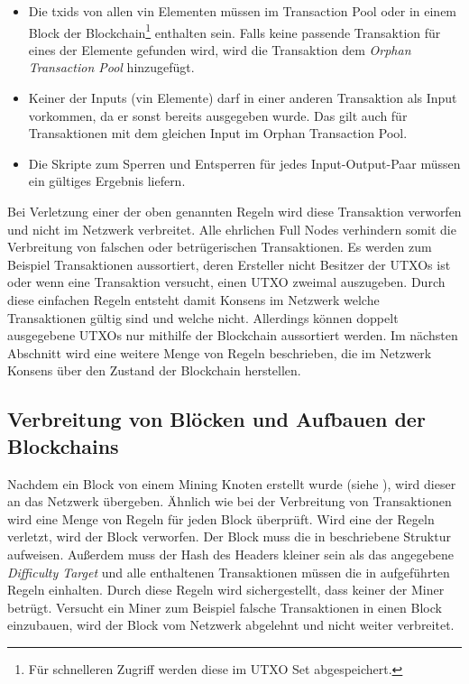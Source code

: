 \documentclass[ngerman,runningheads,a4paper]{llncs}[2018/03/10]
\begin{document}
\begin{itemize}

\item Die txids von allen vin Elementen müssen im Transaction Pool oder in einem Block der Blockchain\footnote{Für schnelleren Zugriff werden diese im UTXO Set abgespeichert.} enthalten sein. Falls keine passende Transaktion für eines der Elemente gefunden wird, wird die Transaktion dem \textit{Orphan Transaction Pool} hinzugefügt.

\item Keiner der Inputs (vin Elemente) darf in einer anderen Transaktion als Input vorkommen, da er sonst bereits ausgegeben wurde. Das gilt auch für Transaktionen mit dem gleichen Input im Orphan Transaction Pool.

\item Die Skripte zum Sperren und Entsperren für jedes Input-Output-Paar müssen ein gültiges Ergebnis liefern.

\end{itemize}

Bei Verletzung einer der oben genannten Regeln wird diese Transaktion verworfen und nicht im Netzwerk verbreitet. Alle ehrlichen Full Nodes verhindern somit die Verbreitung von falschen oder betrügerischen Transaktionen. Es werden zum Beispiel Transaktionen aussortiert, deren Ersteller nicht Besitzer der UTXOs ist oder wenn eine Transaktion versucht, einen UTXO zweimal auszugeben. Durch diese einfachen Regeln entsteht damit Konsens im Netzwerk welche Transaktionen gültig sind und welche nicht. Allerdings können doppelt ausgegebene UTXOs nur mithilfe der Blockchain aussortiert werden. Im nächsten Abschnitt wird eine weitere Menge von Regeln beschrieben, die im Netzwerk Konsens über den Zustand der Blockchain herstellen.

\subsection{Verbreitung von Blöcken und Aufbauen der Blockchains}\label{sec:blockverbreitung}

Nachdem ein Block von einem Mining Knoten erstellt wurde (siehe ), wird dieser an das Netzwerk übergeben. Ähnlich wie bei der Verbreitung von Transaktionen wird eine Menge von Regeln für jeden Block überprüft. Wird eine der Regeln verletzt, wird der Block verworfen. Der Block muss die in  beschriebene Struktur aufweisen. Außerdem muss der Hash des Headers kleiner sein als das angegebene \textit{Difficulty Target} und alle enthaltenen Transaktionen müssen die in  aufgeführten Regeln einhalten. Durch diese Regeln wird sichergestellt, dass keiner der Miner betrügt. Versucht ein Miner zum Beispiel falsche Transaktionen in einen Block einzubauen, wird der Block vom Netzwerk abgelehnt und nicht weiter verbreitet.
\end{document}
